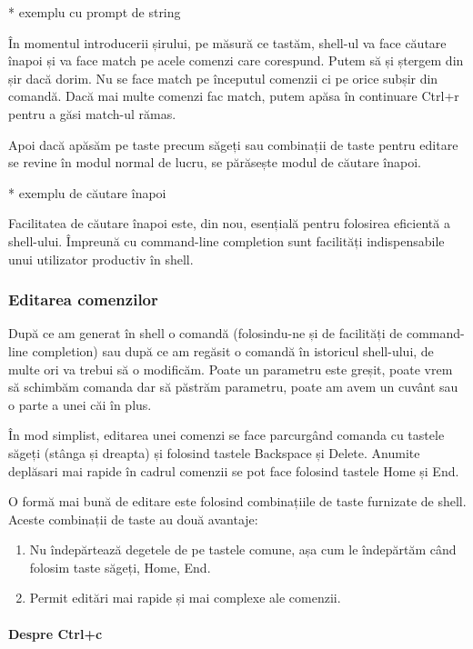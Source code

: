 * exemplu cu prompt de string

În momentul introducerii șirului, pe măsură ce tastăm, shell-ul va face căutare
înapoi și va face match pe acele comenzi care corespund. Putem să și ștergem din
șir dacă dorim. Nu se face match pe începutul comenzii ci pe orice subșir din
comandă. Dacă mai multe comenzi fac match, putem apăsa în continuare Ctrl+r
pentru a găsi match-ul rămas.

Apoi dacă apăsăm pe taste precum săgeți sau combinații de taste pentru editare
se revine în modul normal de lucru, se părăsește modul de căutare înapoi.

* exemplu de căutare înapoi

Facilitatea de căutare înapoi este, din nou, esențială pentru folosirea
eficientă a shell-ului. Împreună cu command-line completion sunt facilități
indispensabile unui utilizator productiv în shell.

\subsubsection{Editarea comenzilor}
\label{sec:cli-editing}

După ce am generat în shell o comandă (folosindu-ne și de facilități de
command-line completion) sau după ce am regăsit o comandă în istoricul
shell-ului, de multe ori va trebui să o modificăm. Poate un parametru este
greșit, poate vrem să schimbăm comanda dar să păstrăm parametru, poate am avem
un cuvânt sau o parte a unei căi în plus.

În mod simplist, editarea unei comenzi se face parcurgând comanda cu tastele
săgeți (stânga și dreapta) și folosind tastele Backspace și Delete. Anumite
deplăsari mai rapide în cadrul comenzii se pot face folosind tastele Home și
End.

O formă mai bună de editare este folosind combinațiile de taste furnizate de
shell. Aceste combinații de taste au două avantaje:

\begin{enumerate}
	\item Nu îndepărtează degetele de pe tastele comune, așa cum le
		îndepărtăm când folosim taste săgeți, Home, End.
	\item Permit editări mai rapide și mai complexe ale comenzii.
\end{enumerate}

\paragraph{Despre Ctrl+c}

